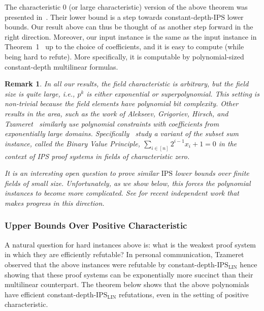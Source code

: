 \documentclass[11pt]{article}
\newtheorem{remark}[theorem]{Remark}
\renewcommand{\comment}[2]{\marginpar{\tiny{\textbf{#1: }\textit{#2}}}}
\newcommand{\nl}[1]{\comment{NL}{#1}}
\newcommand{\vr}[1]{\comment{VR}{#1}}
\newcommand{\snote}[1]{\comment{SS}{#1}}
\newcommand{\IPS}{\mathrm{IPS}}
\newcommand{\IPSLIN}{\mathrm{IPS}_{\mathrm{LIN}}}
\begin{document}
The characteristic $0$ (or large characteristic) version of the above theorem was presented in~\cite{GHT}. Their lower bound is a step towards constant-depth-$\IPS$ lower bounds. Our result above can thus be thought of as another step forward in the right direction.
Moreover, our input instance is the same as the input instance in Theorem~1~\cite{GHT} up to the choice of coefficients, and it is easy to compute (while being hard to refute). More specifically, it is computable by polynomial-sized constant-depth multilinear formulas. 

\begin{remark}
    In all our results, the field characteristic is arbitrary, but the field size is quite large, i.e., $p^k$ is either exponential or superpolynomial.  This setting is non-trivial because the field elements have polynomial bit complexity. Other results in the area, such as the work of Alekseev, Grigoriev, Hirsch, and Tzameret~\cite{AGHT} similarly use polynomial constraints with coefficients from exponentially large domains. Specifically~\cite{AGHT} study a variant of the subset sum instance, called the Binary Value Principle, $\sum_{i \in [n]} 2^{i-1} x_i + 1 = 0$ in the context of IPS proof systems in fields of characteristic zero. %
    
    It is an interesting open question to prove similar $\IPS$ lower bounds over finite fields of small size. Unfortunately, as we show below, this forces the polynomial instances to become more complicated. See  for recent independent work that makes progress in this direction.
\end{remark}

\subsubsection{Upper Bounds Over Positive Characteristic}
\label{sec:intro-upper}

A natural question for hard instances above is: what is the weakest proof system in which they are efficiently refutable? In personal communication, Tzameret observed that the above instances were refutable by constant-depth-$\IPSLIN$ hence showing that these proof systems can be exponentially more succinct than their multilinear counterpart. The theorem below shows that the above polynomials have efficient constant-depth-$\IPSLIN$ refutations, even in the setting of positive characteristic. 
\end{document}
